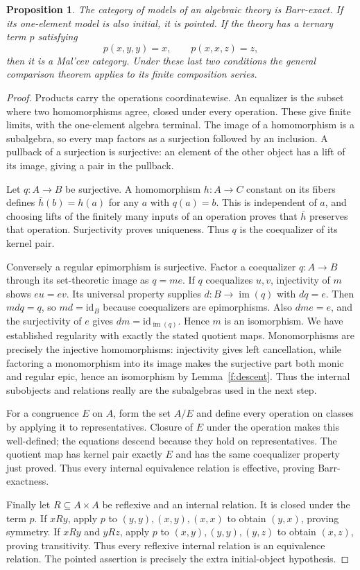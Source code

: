 \documentclass[11pt]{article}
\newtheorem{proposition}[theorem]{Proposition}
\theoremstyle{definition}
\theoremstyle{remark}\newtheorem{remark}[theorem]{Remark}
\newcommand{\id}{\mathrm{id}}
\DeclareMathOperator{\im}{im}
\begin{document}
\begin{proposition}\label{e:algebraic-instances}
The category of models of an algebraic theory is Barr-exact. If its one-element
model is also initial, it is pointed. If the theory has a ternary term $p$
satisfying
\[
p(x,y,y)=x,\qquad p(x,x,z)=z,
\]
then it is a Mal'cev category. Under these last two conditions the general
comparison theorem applies to its finite composition series.
\end{proposition}
\begin{proof}
Products carry the operations coordinatewise. An equalizer is the subset
where two homomorphisms agree, closed under every operation. These give finite
limits, with the one-element algebra terminal. The image of a homomorphism
is a subalgebra, so every map factors as a surjection followed by an inclusion.
A pullback of a surjection is surjective: an element of the other object has
a lift of its image, giving a pair in the pullback.

Let $q:A\to B$ be surjective. A homomorphism $h:A\to C$ constant on its
fibers defines $\bar h(b)=h(a)$ for any $a$ with $q(a)=b$. This is independent
of $a$, and choosing lifts of the finitely many inputs of an operation proves
that $\bar h$ preserves that operation. Surjectivity proves uniqueness.
Thus $q$ is the coequalizer of its kernel pair.

Conversely a regular epimorphism is surjective. Factor a coequalizer
$q:A\to B$ through its set-theoretic image as $q=me$. If $q$ coequalizes
$u,v$, injectivity of $m$ shows $eu=ev$. Its universal property supplies
$d:B\to\im(q)$ with $dq=e$. Then $mdq=q$, so $md=\id_B$ because
coequalizers are epimorphisms. Also $dme=e$, and the surjectivity of $e$
gives $dm=\id_{\im(q)}$. Hence $m$ is an isomorphism.
We have established regularity with exactly the stated quotient maps.
Monomorphisms are precisely the injective homomorphisms: injectivity gives
left cancellation, while factoring a monomorphism into its image makes
the surjective part both monic and regular epic, hence an isomorphism by
Lemma~\ref{f:descent}. Thus the internal subobjects and relations really
are the subalgebras used in the next step.

For a congruence $E$ on $A$, form the set $A/E$ and define every operation
on classes by applying it to representatives. Closure of $E$ under the
operation makes this well-defined; the equations descend because they hold
on representatives. The quotient map has kernel pair exactly $E$ and has
the same coequalizer property just proved. Thus every internal equivalence
relation is effective, proving Barr-exactness.

Finally let $R\subseteq A\times A$ be reflexive and an internal relation.
It is closed under the term $p$. If $xRy$, apply $p$ to
$(y,y),(x,y),(x,x)$ to obtain $(y,x)$, proving symmetry. If $xRy$ and $yRz$,
apply $p$ to $(x,y),(y,y),(y,z)$ to obtain $(x,z)$, proving transitivity.
Thus every reflexive internal relation is an equivalence relation.
The pointed assertion is precisely the extra initial-object hypothesis.
\end{proof}
\end{document}
